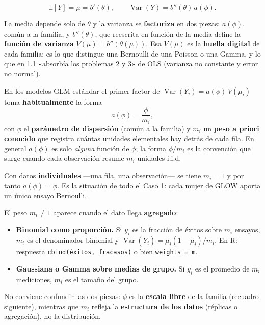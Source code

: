 \documentclass[
  letterpaper,
  DIV=11,
  numbers=noendperiod]{scrartcl}
\providecommand{\tightlist}{%
  \setlength{\itemsep}{0pt}\setlength{\parskip}{0pt}}\usepackage{longtable,booktabs,array}
\begin{document}
\[
\mathbb{E}[Y]=\mu=b'(\theta),\qquad
\operatorname{Var}(Y)=b''(\theta)\,a(\phi).
\]

La media depende solo de \(\theta\) y la varianza se \textbf{factoriza}
en dos piezas: \(a(\phi)\), común a la familia, y \(b''(\theta)\), que
reescrita en función de la media define la \textbf{función de varianza}
\(V(\mu)=b''(\theta(\mu))\). Esa \(V(\mu)\) es la \textbf{huella
digital} de cada familia: es lo que distingue una Bernoulli de una
Poisson o una Gamma, y lo que en 1.1 «absorbía los problemas 2 y 3» de
OLS (varianza no constante y error no normal).

\begin{tcolorbox}[enhanced jigsaw, coltitle=black, rightrule=.15mm, arc=.35mm, leftrule=.75mm, colback=white, colbacktitle=quarto-callout-note-color!10!white, left=2mm, breakable, toptitle=1mm, toprule=.15mm, bottomtitle=1mm, titlerule=0mm, title=\textcolor{quarto-callout-note-color}{\faInfo}\hspace{0.5em}{El otro factor de la varianza: \(a(\phi)\) y los pesos a priori}, bottomrule=.15mm, opacityback=0, opacitybacktitle=0.6, colframe=quarto-callout-note-color-frame]

En los modelos GLM estándar el primer factor de
\(\operatorname{Var}(Y_i)=a(\phi)\,V(\mu_i)\) toma
\textbf{habitualmente} la forma \[a(\phi)=\frac{\phi}{m_i},\] con
\(\phi\) el \textbf{parámetro de dispersión} (común a la familia) y
\(m_i\) un \textbf{peso a priori conocido} que registra cuántas unidades
elementales hay detrás de cada fila. En general \(a(\phi)\) es solo
\emph{alguna} función de \(\phi\); la forma \(\phi/m_i\) es la
convención que surge cuando cada observación resume \(m_i\) unidades
i.i.d.

Con datos \textbf{individuales} ---una fila, una observación--- se tiene
\(m_i=1\) y por tanto \(a(\phi)=\phi\). Es la situación de todo el Caso
1: cada mujer de GLOW aporta un único ensayo Bernoulli.

El peso \(m_i\neq1\) aparece cuando el dato llega \textbf{agregado}:

\begin{itemize}
\tightlist
\item
  \textbf{Binomial como proporción.} Si \(y_i\) es la fracción de éxitos
  sobre \(m_i\) ensayos, \(m_i\) es el denominador binomial y
  \(\operatorname{Var}(\bar Y_i)=\mu_i(1-\mu_i)/m_i\). En R: respuesta
  \texttt{cbind(éxitos,\ fracasos)} o bien \texttt{weights\ =\ m}.
\item
  \textbf{Gaussiana o Gamma sobre medias de grupo.} Si \(y_i\) es el
  promedio de \(m_i\) mediciones, \(m_i\) es el tamaño del grupo.
\end{itemize}

No conviene confundir las dos piezas: \(\phi\) es la \textbf{escala
libre} de la familia (recuadro siguiente), mientras que \(m_i\) refleja
la \textbf{estructura de los datos} (réplicas o agregación), no la
distribución.

\end{tcolorbox}
\end{document}
